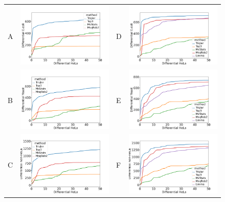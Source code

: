 \documentclass[11pt]{article}
\begin{document}
\begin{figure}[hbt]
    \centering
    \begin{tabular}{lclc} 
        A & \includegraphics[width=0.4\linewidth]{../../result/report_plots_pipeline/diff_HeLa_vs_nonHeLa_ID_ecoli_0.png} & 
        D & \includegraphics[width=0.4\linewidth]{../../result/report_plots_pipeline/diff_HeLa_vs_nonHeLa_PS_ecoli_0_Limma.png} \\ 
        B & \includegraphics[width=0.4\linewidth]{../../result/report_plots_pipeline/diff_HeLa_vs_nonHeLa_ID_yeast_0.png} & 
        E & \includegraphics[width=0.4\linewidth]{../../result/report_plots_pipeline/diff_HeLa_vs_nonHeLa_PS_yeast_0_Limma.png} \\
        C & \includegraphics[width=0.4\linewidth]{../../result/report_plots_pipeline/diff_HeLa_vs_nonHeLa_ID_all_0.png} & 
        F & \includegraphics[width=0.4\linewidth]{../../result/report_plots_pipeline/diff_HeLa_vs_nonHeLa_PS_all_0_Limma.png} \\ 


\end{tabular}
\end{figure}
\end{document}
